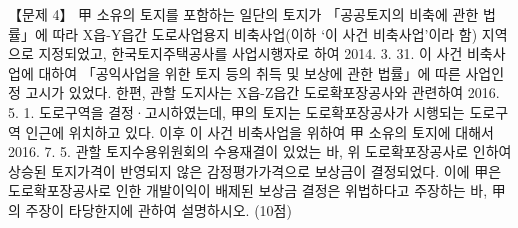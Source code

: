 \begin{longquestion}{【문제 4】}
甲 소유의 토지를 포함하는 일단의 토지가 「공공토지의 비축에 관한 법률」에 따라 X읍-Y읍간 도로사업용지 비축사업(이하 ‘이 사건 비축사업’이라 함) 지역으로 지정되었고, 한국토지주택공사를 사업시행자로 하여 2014. 3. 31. 이 사건 비축사업에 대하여 「공익사업을 위한 토지 등의 취득 및 보상에 관한 법률」에 따른 사업인정 고시가 있었다. 한편, 관할 도지사는 X읍-Z읍간 도로확포장공사와 관련하여 2016. 5. 1. 도로구역을 결정·고시하였는데, 甲의 토지는 도로확포장공사가 시행되는 도로구역 인근에 위치하고 있다. 이후 이 사건 비축사업을 위하여 甲 소유의 토지에 대해서 2016. 7. 5. 관할 토지수용위원회의 수용재결이 있었는 바, 위 도로확포장공사로 인하여 상승된 토지가격이 반영되지 않은 감정평가가격으로 보상금이 결정되었다. 이에 甲은 도로확포장공사로 인한 개발이익이 배제된 보상금 결정은 위법하다고 주장하는 바, 甲의 주장이 타당한지에 관하여 설명하시오. (10점) \par
\end{longquestion}
